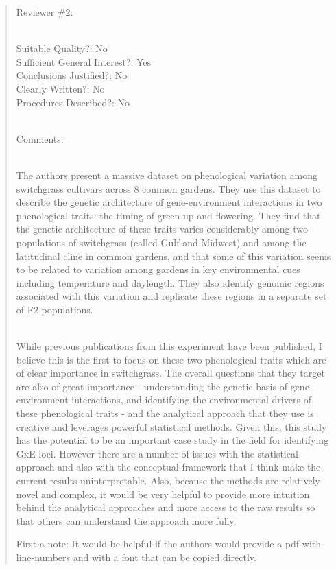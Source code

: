 \documentclass[
  letterpaper,
  DIV=11,
  numbers=noendperiod]{scrartcl}
\begin{document}
\begin{quote}
\begin{tcolorbox}[enhanced jigsaw, colframe=quarto-callout-warning-color-frame, rightrule=.15mm, leftrule=.75mm, left=2mm, breakable, toprule=.15mm, arc=.35mm, bottomrule=.15mm, opacityback=0, colback=white]

Reviewer \#2:\\
\strut \\
Suitable Quality?: No\\
Sufficient General Interest?: Yes\\
Conclusions Justified?: No\\
Clearly Written?: No\\
Procedures Described?: No\\
\strut \\
Comments:\\
\strut \\
The authors present a massive dataset on phenological variation among
switchgrass cultivars across 8 common gardens. They use this dataset to
describe the genetic architecture of gene-environment interactions in
two phenological traits: the timing of green-up and flowering. They find
that the genetic architecture of these traits varies considerably among
two populations of switchgrass (called Gulf and Midwest) and among the
latitudinal cline in common gardens, and that some of this variation
seems to be related to variation among gardens in key environmental cues
including temperature and daylength. They also identify genomic regions
associated with this variation and replicate these regions in a separate
set of F2 populations.\\
\strut \\
While previous publications from this experiment have been published, I
believe this is the first to focus on these two phenological traits
which are of clear importance in switchgrass. The overall questions that
they target are also of great importance - understanding the genetic
basis of gene-environment interactions, and identifying the
environmental drivers of these phenological traits - and the analytical
approach that they use is creative and leverages powerful statistical
methods. Given this, this study has the potential to be an important
case study in the field for identifying GxE loci. However there are a
number of issues with the statistical approach and also with the
conceptual framework that I think make the current results
uninterpretable. Also, because the methods are relatively novel and
complex, it would be very helpful to provide more intuition behind the
analytical approaches and more access to the raw results so that others
can understand the approach more fully.

First a note: It would be helpful if the authors would provide a pdf
with line-numbers and with a font that can be copied directly.

\end{tcolorbox}
\end{quote}
\end{document}
